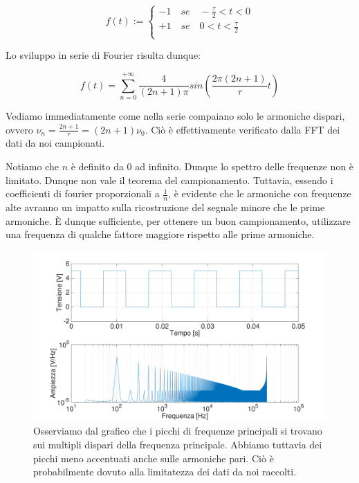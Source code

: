 \begin{displaymath}
f(t):=
\begin{cases}
-1 \quad se \quad -\frac{\tau}{2}<t<0 \\
+1 \quad se \quad 0<t<\frac{\tau}{2} \\ 
\end{cases}
\end{displaymath}

Lo sviluppo in serie di Fourier risulta dunque: 

\begin{equation}
f(t)=\sum_{n=0}^{+\infty}\frac{4}{(2n+1)\pi}sin (\frac{2\pi(2n+1)}{\tau}t)
\end{equation}

Vediamo immediatamente come nella serie compaiano solo le armoniche dispari, ovvero $\nu_n=\frac{2n+1}{\tau}=(2n+1)\nu_0$. Ciò è effettivamente verificato dalla FFT dei dati da noi campionati.

Notiamo che $n$ è definito da 0 ad infinito. Dunque lo spettro delle frequenze non è limitato. Dunque non vale il teorema del campionamento. Tuttavia, essendo i coefficienti di fourier proporzionali a $\frac{1}{n}$, è evidente che le armoniche con frequenze alte avranno un impatto sulla ricostruzione del segnale minore che le prime armoniche. È dunque sufficiente, per ottenere un buon campionamento, utilizzare una frequenza di qualche fattore maggiore rispetto alle prime armoniche. 





\begin{figure}[H]
\centering
	\includegraphics[width=.73\textwidth]{../E13/latex/quadra100hz@10000,200000.pdf}
	\caption{Osserviamo dal grafico che i picchi di frequenze principali si trovano sui multipli dispari della frequenza principale. Abbiamo tuttavia dei picchi meno accentuati anche sulle armoniche pari. Ciò è probabilmente dovuto alla limitatezza dei dati da noi raccolti.}
	\label{quadra}
\end{figure}


